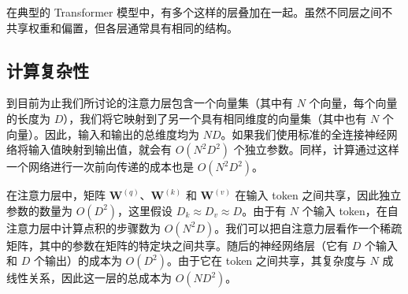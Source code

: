 \documentclass[../../main.tex]{subfiles}
\begin{document}
\begin{center}
\setlength{\fboxsep}{7pt}%
\end{center}

在典型的 Transformer 模型中，有多个这样的层叠加在一起。虽然不同层之间不共享权重和偏置，但各层通常具有相同的结构。

\subsection{计算复杂性}\label{subsection:ch12-计算复杂性}

到目前为止我们所讨论的注意力层包含一个向量集（其中有 $N$ 个向量，每个向量的长度为 $D$），我们将它映射到了另一个具有相同维度的向量集（其中也有 $N$ 个向量）。因此，输入和输出的总维度均为 $ND$。如果我们使用标准的全连接神经网络将输入值映射到输出值，就会有 $O(N^2D^2)$ 个独立参数。同样，计算通过这样一个网络进行一次前向传递的成本也是 $O(N^2D^2)$。

在注意力层中，矩阵 $\mathbf{W}^{(q)}$、$\mathbf{W}^{(k)}$ 和 $\mathbf{W}^{(v)}$ 在输入 token 之间共享，因此独立参数的数量为 $O(D^2)$，这里假设 $D_k\approx D_v\approx D$。由于有 $N$ 个输入 token，在自注意力层中计算点积的步骤数为 $O(N^2D)$。我们可以把自注意力层看作一个稀疏矩阵，其中的参数在矩阵的特定块之间共享。随后的神经网络层（它有 $D$ 个输入和 $D$ 个输出）的成本为 $O(D^2)$。由于它在 token 之间共享，其复杂度与 $N$ 成线性关系，因此这一层的总成本为 $O(ND^2)$。
\end{document}
